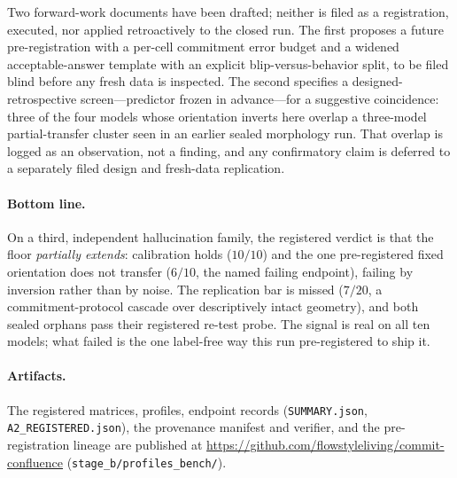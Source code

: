 \documentclass[11pt]{article}
\begin{document}
Two forward-work documents have been drafted; neither is filed as a registration, executed, nor
applied retroactively to the closed run. The first proposes a future pre-registration with a
per-cell commitment error budget and a widened acceptable-answer template with an explicit
blip-versus-behavior split, to be filed blind before any fresh data is inspected. The second
specifies a designed-retrospective screen---predictor frozen in advance---for a suggestive
coincidence: three of the four models whose orientation inverts here overlap a three-model
partial-transfer cluster seen in an earlier sealed morphology run. That overlap is logged as an
observation, not a finding, and any confirmatory claim is deferred to a separately filed design
and fresh-data replication.

\paragraph{Bottom line.} On a third, independent hallucination family, the registered verdict is
that the floor \emph{partially extends}: calibration holds ($10/10$) and the one pre-registered
fixed orientation does not transfer ($6/10$, the named failing endpoint), failing by inversion
rather than by noise. The replication bar is missed ($7/20$, a commitment-protocol cascade over
descriptively intact geometry), and both sealed orphans pass their registered re-test probe. The
signal is real on all ten models; what failed is the one label-free way this run pre-registered
to ship it.

\paragraph{Artifacts.} The registered matrices, profiles, endpoint records
(\texttt{SUMMARY.json}, \texttt{A2\_REGISTERED.json}), the provenance manifest and verifier, and
the pre-registration lineage are published at
\url{https://github.com/flowstyleliving/commit-confluence} (\texttt{stage\_b/profiles\_bench/}).
\end{document}
